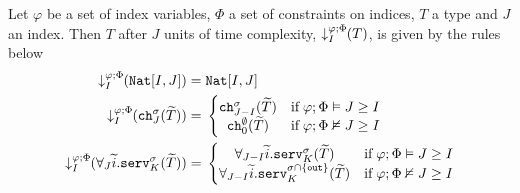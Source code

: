 \begin{definition}\label{def:delaysized}
Let $\varphi$ be a set of index variables, $\Phi$ a set of constraints on indices, $T$ a type and $J$ an index. Then $T$ after $J$ units of time complexity, $\susume{T}{\varphi}{\Phi}{I}$, is given by the rules below
\begin{align*}
    \susume{\natinterval{I}{J}}{\varphi}{\Phi}{I} =&\; \natinterval{I}{J}\\
    \susume{\texttt{ch}^\sigma_J(\widetilde{T})}{\varphi}{\Phi}{I} =&\; \left\{ \begin{matrix}
        \texttt{ch}^\sigma_{J-I}(\widetilde{T}) & \text{if}\; \varphi;\Phi \vDash J \geq I\\
        \texttt{ch}^\emptyset_{0}(\widetilde{T}) & \text{if}\; \varphi;\Phi \nvDash J \geq I
    \end{matrix} \right.\\
    \susume{\forall_J\widetilde{i}.\texttt{serv}^\sigma_K(\widetilde{T})}{\varphi}{\Phi}{I} =&\; \left\{ \begin{matrix}
        \forall_{J-I}\widetilde{i}.\texttt{serv}^\sigma_K(\widetilde{T}) & \text{if}\; \varphi;\Phi \vDash J \geq I\\
        \forall_{J-I}\widetilde{i}.\texttt{serv}^{\sigma \cap \{\texttt{out}\}}_K(\widetilde{T}) & \text{if}\; \varphi;\Phi \nvDash J \geq I
    \end{matrix} \right.
\end{align*}
\end{definition}

